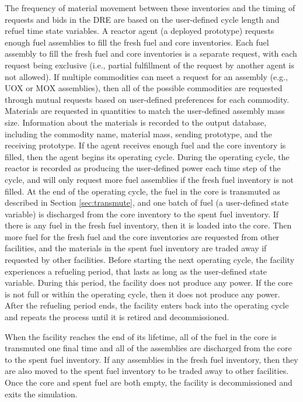 The frequency of material movement between these inventories and 
the timing of requests and bids in the \gls{DRE} are based on 
the user-defined cycle length and refuel time state variables. 
A reactor agent (a deployed prototype) requests enough fuel assemblies 
to fill the fresh fuel and core inventories.
Each fuel assembly to fill the fresh fuel and core inventories 
is a separate request, with each request 
being exclusive (i.e., partial fulfillment of the request by another 
agent is not allowed). If multiple commodities can meet a request for 
an assembly (e.g., UOX or MOX assemblies), then all of the possible 
commodities are requested through mutual requests based on user-defined 
preferences for each commodity. Materials are requested in quantities 
to match the user-defined assembly mass size. Information about the 
materials is recorded to the output database, including the 
commodity name, material mass, sending prototype, and the receiving 
prototype. If the agent 
receives enough fuel and the core inventory is filled, then the 
agent begins its operating cycle. During the operating cycle, the 
reactor is recorded as producing the user-defined power each time step 
of the cycle, and will only request more fuel assemblies if the 
fresh fuel inventory is not filled. At the end of the operating 
cycle, the fuel in the core is transmuted as described in Section 
\ref{sec:transmute}, and one batch of fuel (a user-defined state variable)
is discharged from the core inventory to the spent fuel inventory. 
If there is any fuel in the fresh fuel inventory, then it is 
loaded into the core. Then more fuel for the fresh fuel and the 
core inventories are requested from other facilities, and the 
materials in the spent fuel inventory are traded away if requested 
by other facilities. Before starting the next operating cycle, the 
facility experiences a refueling period, that lasts as long as the 
user-defined state variable. During this period, the facility does 
not produce any power. If the core is not full or within the operating 
cycle, then it does not produce any power. After the refueling period 
ends, the facility 
enters back into the operating cycle and repeats the process until it 
is retired and decommissioned. 

When the facility reaches the end of its lifetime, all of the fuel in 
the core is transmuted one final time and all of the 
assemblies are discharged from the core to the spent fuel
inventory. If any assemblies in the fresh fuel inventory, then 
they are also moved to the spent fuel inventory to be traded 
away to other facilities. Once the core and spent fuel are 
both empty, the facility is decommissioned and exits the simulation.


